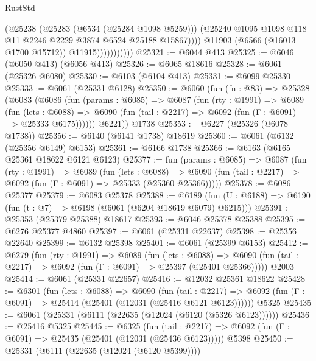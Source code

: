\begin{lexlean}{RustStd}
\begin{coremodule}
{\begin{coremodule}
{{{{{{{{{{{{{{{{{{{{{{{{{{                              (@25238
                                (@25283 (@6534 (@25284 @1098 @5259)))
                                (@25240
                                  @1095
                                  @1098
                                  @118
                                  @11
                                  @2246
                                  @2229
                                  @3874
                                  @6524
                                  @25188
                                  @15867))))
                          @11903
                          (@6566 (@16013 @1700 @15712))
                          @11915)))))))))))
@25321 := @6044 @413
@25325 := @6046 (@6050 @413) (@6056 @413)
@25326 := @6065 @18616
@25328 := @6061 (@25326 @6080)
@25330 := @6103 (@6104 @413)
@25331 := @6099 @25330
@25333 := @6061 (@25331 @6128)
@25350 := @6060
    (fun (fn : @83) =>
    @25328
      (@6083
        (@6086
          (fun (params : @6085) =>
          @6087
            (fun (rty : @1991) =>
            @6089
              (fun (lets : @6088) =>
              @6090 (fun (tail : @2217) => @6092 (fun (Γ : @6091) => @25333 @6175))))))
        @6221))
    @1738
@25353 := @6227 (@25326 (@6078 @1738))
@25356 := @6140 (@6141 @1738) @18619
@25360 := @6061 (@6132 (@25356 @6149) @6153)
@25361 := @6166 @1738
@25366 := @6163 (@6165 @25361 @18622 @6121 @6123)
@25377 := fun (params : @6085) =>
  @6087
    (fun (rty : @1991) =>
    @6089
      (fun (lets : @6088) =>
      @6090 (fun (tail : @2217) => @6092 (fun (Γ : @6091) => @25333 (@25360 @25366)))))
@25378 := @6086 @25377
@25379 := @6083 @25378
@25388 := @6189
    (fun (U : @6188) => @6190 (fun (t : @7) => @6198 (@6061 (@6204 @18619 @6079) @6215)))
@25391 := @25353 (@25379 @25388) @18617
@25393 := @6046 @25378 @25388
@25395 := @6276 @25377 @4860
@25397 := @6061 (@25331 @22637)
@25398 := @25356 @22640
@25399 := @6132 @25398
@25401 := @6061 (@25399 @6153)
@25412 := @6279
    (fun (rty : @1991) =>
    @6089
      (fun (lets : @6088) =>
      @6090 (fun (tail : @2217) => @6092 (fun (Γ : @6091) => @25397 (@25401 @25366)))))
    @2003
@25414 := @6061 (@25331 @22657)
@25416 := @12032 @25361 @18622
@25428 := @6301
    (fun (lets : @6088) =>
    @6090
      (fun (tail : @2217) =>
      @6092 (fun (Γ : @6091) => @25414 (@25401 (@12031 (@25416 @6121 @6123))))))
    @5325
@25435 := @6061 (@25331 (@6111 (@22635 (@12024 (@6120 (@5326 @6123))))))
@25436 := @25416 @5325
@25445 := @6325
    (fun (tail : @2217) => @6092 (fun (Γ : @6091) => @25435 (@25401 (@12031 (@25436 @6123)))))
    @5398
@25450 := @25331 (@6111 (@22635 (@12024 (@6120 @5399))))
}}}}}}}}}}}}}}}}}}}}}}}}}}
\end{coremodule}}
\end{coremodule}
\end{lexlean}
